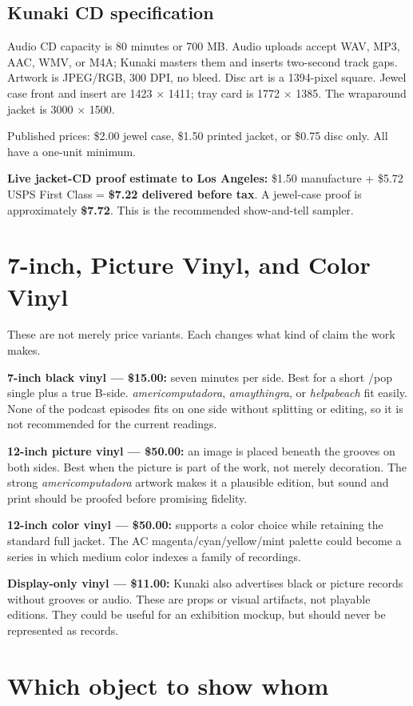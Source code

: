 \documentclass[11pt]{article}
\newcommand{\mediumtitle}[1]{\section*{\Huge\color{acpink}#1}}
\begin{document}
\subsection*{Kunaki CD specification}

Audio CD capacity is 80 minutes or 700 MB. Audio uploads accept WAV, MP3, AAC, WMV, or M4A; Kunaki masters them and inserts two-second track gaps. Artwork is JPEG/RGB, 300 DPI, no bleed. Disc art is a 1394-pixel square. Jewel case front and insert are 1423 $\times$ 1411; tray card is 1772 $\times$ 1385. The wraparound jacket is 3000 $\times$ 1500.

Published prices: \$2.00 jewel case, \$1.50 printed jacket, or \$0.75 disc only. All have a one-unit minimum.

\textbf{Live jacket-CD proof estimate to Los Angeles:} \$1.50 manufacture + \$5.72 USPS First Class = \textbf{\$7.22 delivered before tax}. A jewel-case proof is approximately \textbf{\$7.72}. This is the recommended show-and-tell sampler.

\clearpage
\mediumtitle{7-inch, Picture Vinyl, and Color Vinyl}

These are not merely price variants. Each changes what kind of claim the work makes.

\textbf{7-inch black vinyl --- \$15.00:} seven minutes per side. Best for a short /pop single plus a true B-side. \textit{americomputadora}, \textit{amaythingra}, or \textit{helpabeach} fit easily. None of the podcast episodes fits on one side without splitting or editing, so it is not recommended for the current readings.

\textbf{12-inch picture vinyl --- \$50.00:} an image is placed beneath the grooves on both sides. Best when the picture is part of the work, not merely decoration. The strong \textit{americomputadora} artwork makes it a plausible edition, but sound and print should be proofed before promising fidelity.

\textbf{12-inch color vinyl --- \$50.00:} supports a color choice while retaining the standard full jacket. The AC magenta/cyan/yellow/mint palette could become a series in which medium color indexes a family of recordings.

\textbf{Display-only vinyl --- \$11.00:} Kunaki also advertises black or picture records without grooves or audio. These are props or visual artifacts, not playable editions. They could be useful for an exhibition mockup, but should never be represented as records.

\section*{Which object to show whom}
\end{document}
